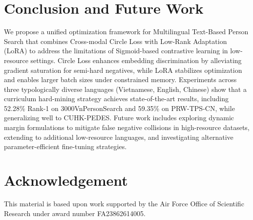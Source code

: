 \documentclass{article}
\begin{document}
\section{Conclusion and Future Work}\label{conclusion}
We propose a unified optimization framework for Multilingual Text-Based Person Search that combines Cross-modal Circle Loss with Low-Rank Adaptation (LoRA) to address the limitations of Sigmoid-based contrastive learning in low-resource settings. Circle Loss enhances embedding discrimination by alleviating gradient saturation for semi-hard negatives, while LoRA stabilizes optimization and enables larger batch sizes under constrained memory. Experiments across three typologically diverse languages (Vietnamese, English, Chinese) show that a curriculum hard-mining strategy achieves state-of-the-art results, including 52.28\% Rank-1 on 3000VnPersonSearch and 59.35\% on PRW-TPS-CN, while generalizing well to CUHK-PEDES. Future work includes exploring dynamic margin formulations to mitigate false negative collisions in high-resource datasets, extending to additional low-resource languages, and investigating alternative parameter-efficient fine-tuning strategies.

\section*{Acknowledgement}
This material is based upon work supported by the Air Force Office of Scientific Research under award number FA23862614005.

\vfill\pagebreak



\end{document}
